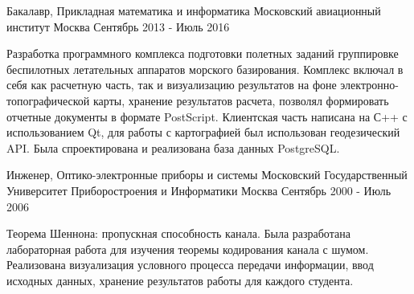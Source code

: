 

\begin{cventries}

  \cventry
    {Бакалавр, Прикладная математика и информатика} %
    {Московский авиационный институт} %
    {Москва} %
    {Сентябрь 2013 - Июль 2016} %
    {
      \begin{cvitems} %
        \item {Разработка программного комплекса подготовки полетных заданий группировке беспилотных летательных аппаратов морского базирования. Комплекс включал в себя как расчетную часть, так и визуализацию результатов на фоне электронно-топографической карты, хранение результатов расчета, позволял формировать отчетные документы в формате PostScript. Клиентская часть написана на С++ с использованием Qt, для работы с картографией был использован геодезический API. Была спроектирована и реализована база данных PostgreSQL.}
      \end{cvitems}
    }
  \cventry
    {Инженер, Оптико-электронные приборы и системы} %
    {Московский Государственный Университет Приборостроения и Информатики} %
    {Москва} %
    {Сентябрь 2000 - Июль 2006} %
    {
      \begin{cvitems} %
        \item {Теорема Шеннона: пропускная способность канала. Была разработана лабораторная работа для изучения теоремы кодирования канала с шумом. Реализована визуализация условного процесса передачи информации, ввод исходных данных, хранение результатов работы для каждого студента.}
      \end{cvitems}
    }

\end{cventries}
